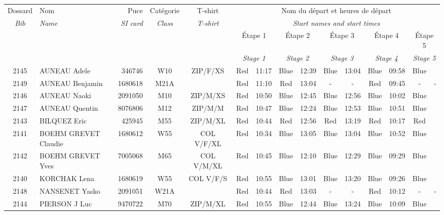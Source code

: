 \documentclass{report}
\begin{document}
  \begin{longtable}{|c|l|r|c|c|*{5}{cc|}}
    Dossard & Nom  & Puce    & Catégorie & T-shirt & \multicolumn{10}{c|}{Nom du départ et heures de départ} \\
    \itshape Bib     & \itshape Name & \itshape SI card & \itshape Class  & \itshape  T-shirt  & \multicolumn{10}{c|}{\itshape Start names and start times} \\
    \hline
    & & & & & \multicolumn{2}{c|}{Étape 1} & \multicolumn{2}{c|}{Étape 2} & \multicolumn{2}{c|}{Étape 3} & \multicolumn{2}{c|}{Étape 4} & \multicolumn{2}{c|}{Étape 5} \\
    & & & & & \multicolumn{2}{c|}{\itshape Stage 1} & \multicolumn{2}{c|}{\itshape Stage 2} & \multicolumn{2}{c|}{\itshape Stage 3} & \multicolumn{2}{c|}{\itshape Stage 4} & \multicolumn{2}{c|}{\itshape Stage 5} \\
    \hline
    2145 & AUNEAU Adele & 346746 & W10 & ZIP/F/XS & Red & 11:17 & Blue & 12:39 & Blue & 13:04 & Blue & 09:58 & Blue &  \\
    2149 & AUNEAU Benjamin & 1680618 & M21A &   & Red & 11:10 & Red & 13:04 & - &  - & Red & 09:45 & - &  -\\
    2146 & AUNEAU Naoki & 2091050 & M10 & ZIP/M/XS & Red & 10:50 & Blue & 12:45 & Blue & 12:56 & Blue & 10:02 & Blue &  \\
    2147 & AUNEAU Quentin & 8076806 & M12 & ZIP/M/M & Red & 10:47 & Blue & 12:24 & Blue & 12:53 & Blue & 10:51 & Blue &  \\
    2143 & BILQUEZ Eric & 425945 & M55 & ZIP/M/XL & Red & 10:44 & Red & 12:56 & Red & 13:19 & Red & 10:17 & Red &  \\
    2141 & BOEHM GREVET Claudie & 1680612 & W55 & COL V/F/XL & Red & 10:34 & Blue & 13:05 & Blue & 13:04 & Blue & 10:52 & Blue &  \\
    2142 & BOEHM GREVET Yves & 7005068 & M65 & COL V/M/XL & Red & 10:45 & Blue & 12:10 & Blue & 12:29 & Blue & 09:29 & Blue &  \\
    2140 & KORCHAK Lena & 1680619 & W55 & COL V/F/S & Red & 10:55 & Blue & 13:01 & Blue & 13:20 & Blue & 09:26 & Blue &  \\
    2148 & NANSENET Yasko & 2091051 & W21A &   & Red & 10:44 & Red & 13:03 & - &  - & Red & 10:12 & - &  -\\
    2144 & PIERSON J Luc & 9470722 & M70 & ZIP/M/XL & Red & 10:55 & Blue & 12:44 & Blue & 13:24 & Blue & 10:09 & Blue &  \\
  \end{longtable}
\newpage
\end{document}
